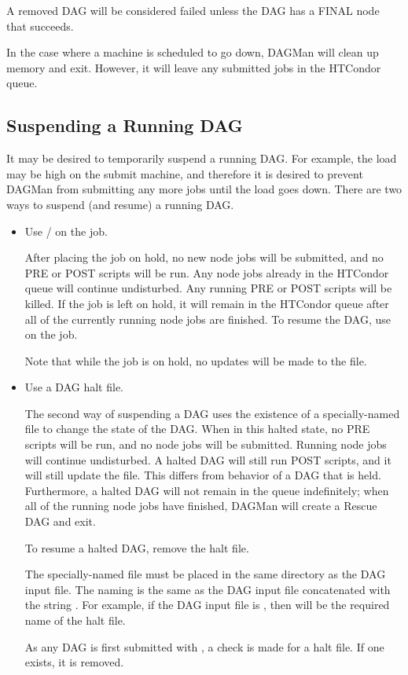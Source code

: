 A removed DAG will be considered failed unless the
DAG has a FINAL node that succeeds.

In the case where a
machine is scheduled to go down,
DAGMan will clean up memory and exit.
However, it will leave any submitted jobs
in the HTCondor queue.

\subsection{\label{sec:DagSuspend}Suspending a Running DAG}

It may be desired to temporarily suspend a running DAG.
For example, the load may be high on the submit machine,
and therefore it is desired to prevent DAGMan from
submitting any more jobs until the load goes down.
There are two ways to suspend (and resume) a running DAG.

\begin{itemize}
\item Use / on the  job.

After placing the  job on hold,
no new node jobs will be submitted,
and no PRE or POST scripts will be run.
Any node jobs already in the HTCondor queue will continue undisturbed.
Any running PRE or POST scripts will be killed.
If the  job is left on hold,
it will remain in the HTCondor queue after all of the currently running
node jobs are finished.
To resume the DAG, use  on the  job.

Note that while the  job is on hold,
no updates will be made to the  file.

\item Use a DAG halt file.

The second way of suspending a DAG uses the existence of a specially-named
file to change the state of the DAG.
When in this halted state,
no PRE scripts will be run, and no node jobs will be submitted.  
Running node jobs will continue undisturbed.
A halted DAG will still run POST scripts,
and it will still update the  file.
This differs from behavior of a DAG that is held.
Furthermore, a halted DAG will not remain in the queue indefinitely;
when all of the running node jobs have finished, 
DAGMan will create a Rescue DAG and exit.

To resume a halted DAG, remove the halt file.

The specially-named file must be placed in the same directory
as the DAG input file.
The naming is the same as the DAG input file concatenated with the
string .
For example, if the DAG input file is , 
then  will be the required name of the halt file.

As any DAG is first submitted with , 
a check is made for a halt file.
If one exists, it is removed.
\end{itemize}

